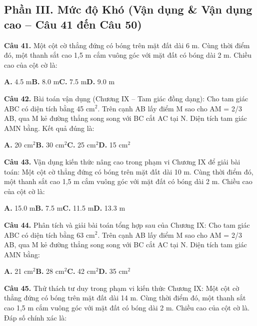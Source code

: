 \documentclass[11pt,a4paper]{article}
\begin{document}
\subsection*{\color{accent} Phần III. Mức độ Khó (Vận dụng \& Vận dụng cao -- Câu 41 đến Câu 50)}
\textbf{\color{primary} Câu 41.} Một cột cờ thẳng đứng có bóng trên mặt đất dài 6 m. Cùng thời điểm đó, một thanh sắt cao 1,5 m cắm vuông góc với mặt đất có bóng dài 2 m. Chiều cao của cột cờ là:\par
\hspace*{1.5em}\textbf{A.} 4.5 m\quad\quad \textbf{B.} 8.0 m\quad\quad \textbf{C.} 7.5 m\quad\quad \textbf{D.} 9.0 m\par\vspace{2pt}
\textbf{\color{primary} Câu 42.} Bài toán vận dụng (Chương IX – Tam giác đồng dạng): Cho tam giác ABC có diện tích bằng 45 cm$^2$. Trên cạnh AB lấy điểm M sao cho AM = 2/3 AB, qua M kẻ đường thẳng song song với BC cắt AC tại N. Diện tích tam giác AMN bằng. Kết quả đúng là:\par
\hspace*{1.5em}\textbf{A.} 20 cm$^2$\quad\quad \textbf{B.} 30 cm$^2$\quad\quad \textbf{C.} 25 cm$^2$\quad\quad \textbf{D.} 15 cm$^2$\par\vspace{2pt}
\textbf{\color{primary} Câu 43.} Vận dụng kiến thức nâng cao trong phạm vi Chương IX để giải bài toán: Một cột cờ thẳng đứng có bóng trên mặt đất dài 10 m. Cùng thời điểm đó, một thanh sắt cao 1,5 m cắm vuông góc với mặt đất có bóng dài 2 m. Chiều cao của cột cờ là:\par
\hspace*{1.5em}\textbf{A.} 15.0 m\quad\quad \textbf{B.} 7.5 m\quad\quad \textbf{C.} 11.5 m\quad\quad \textbf{D.} 13.3 m\par\vspace{2pt}
\textbf{\color{primary} Câu 44.} Phân tích và giải bài toán tổng hợp sau của Chương IX: Cho tam giác ABC có diện tích bằng 63 cm$^2$. Trên cạnh AB lấy điểm M sao cho AM = 2/3 AB, qua M kẻ đường thẳng song song với BC cắt AC tại N. Diện tích tam giác AMN bằng:\par
\hspace*{1.5em}\textbf{A.} 21 cm$^2$\quad\quad \textbf{B.} 28 cm$^2$\quad\quad \textbf{C.} 42 cm$^2$\quad\quad \textbf{D.} 35 cm$^2$\par\vspace{2pt}
\textbf{\color{primary} Câu 45.} Thử thách tư duy trong phạm vi kiến thức Chương IX: Một cột cờ thẳng đứng có bóng trên mặt đất dài 14 m. Cùng thời điểm đó, một thanh sắt cao 1,5 m cắm vuông góc với mặt đất có bóng dài 2 m. Chiều cao của cột cờ là. Đáp số chính xác là:\par
\end{document}
